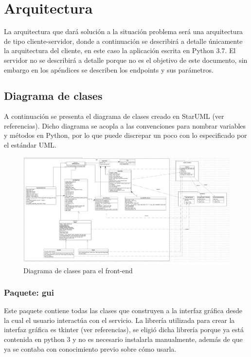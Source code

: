 \section{Arquitectura}
La arquitectura que dará solución a la situación problema será una arquitectura de tipo cliente-servidor, donde a continuación se describirá a detalle únicamente la arquitectura del cliente, en este caso la aplicación escrita en Python 3.7. El servidor no se describirá a detalle porque no es el objetivo de este documento, sin embargo en los apéndices se describen los endpoints y sus parámetros.

\subsection{Diagrama de clases}

A continuación se presenta el diagrama de clases creado en StarUML (ver referencias). Dicho diagrama se acopla a las convenciones para nombrar variables y métodos en Python, por lo que puede discrepar un poco con lo especificado por el estándar UML.

\begin{figure}[h!]
	\centering
	\includegraphics[width=1\linewidth]{class_diagram.png}
	\caption{Diagrama de clases para el front-end}
	\label{fig:class-diagram}
\end{figure}

\subsubsection{Paquete: gui}
Este paquete contiene todas las clases que construyen a la interfaz gráfica desde la cual el usuario interactúa con el servicio. La librería utilizada para crear la interfaz gráfica es tkinter (ver referencias), se eligió dicha librería porque ya está contenida en python 3 y no es necesario instalarla manualmente, además de que ya se contaba con conocimiento previo sobre cómo usarla.

